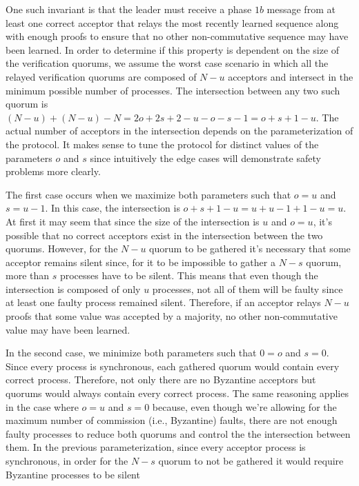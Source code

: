 \iffalse
One such invariant is that the leader must receive a phase $1b$ message from at least one correct acceptor that relays the most recently learned sequence along with enough proofs to ensure that no other non-commutative sequence may have been learned. In order to determine if this property is dependent on the size of the verification quorums, we assume the worst case scenario in which all the relayed verification quorums are composed of $N-u$ acceptors and intersect in the minimum possible number of processes. The intersection between any two such quorum is $(N-u)+(N-u)-N= 2o+2s+2-u-o-s-1= o+s+1-u$. The actual number of acceptors in the intersection depends on the parameterization of the protocol. It makes sense to tune the protocol for distinct values of the parameters $o$ and $s$ since intuitively the edge cases will demonstrate safety problems more clearly. \par
The first case occurs when we maximize both parameters such that $o=u$ and $s=u-1$. In this case, the intersection is $o+s+1-u=u+u-1+1-u=u$. At first it may seem that since the size of the intersection is $u$ and $o=u$, it's possible that no correct acceptors exist in the intersection between the two quorums. However, for the $N-u$ quorum to be gathered it's necessary that some acceptor remains silent since, for it to be impossible to gather a $N-s$ quorum, more than $s$ processes have to be silent. This means that even though the intersection is composed of only $u$ processes, not all of them will be faulty since at least one faulty process remained silent. Therefore, if an acceptor relays $N-u$ proofs that some value was accepted by a majority, no other non-commutative value may have been learned.\par
In the second case, we minimize both parameters such that $0=o$ and $s=0$. Since every process is synchronous, each gathered quorum would contain every correct process. Therefore, not only there are no Byzantine acceptors but quorums would always contain every correct process. The same reasoning applies in the case where $o=u$ and $s=0$ because, even though we're allowing for the maximum number of commission (i.e., Byzantine) faults, there are not enough faulty processes to reduce both quorums and control the the intersection between them. In the previous parameterization, since every acceptor process is synchronous, in order for the $N-s$ quorum to not be gathered it would require Byzantine processes to be silent \par

